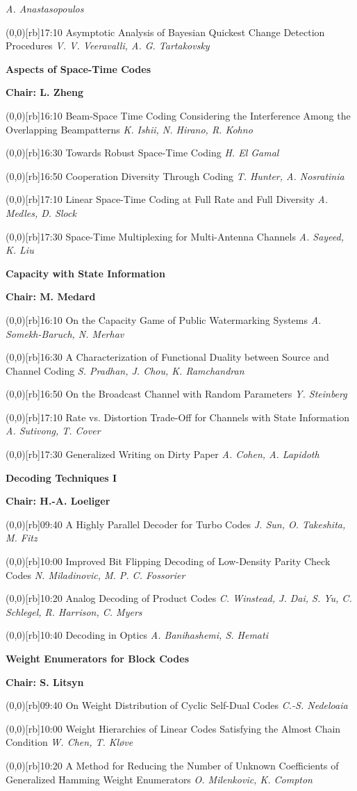 \documentclass[a5paper,twoside]{article}
\def\period#1{\flushleft{\large\bfseries #1}\markboth{\sf #1}{\sf #1}}
\def\sesstitle#1{\vspace{.45\bigskipamount}\par{\bfseries #1}\par}
\def\sesschair#1{{\bfseries Chair: #1}\par\vspace{.65\medskipamount}}
\def\papertime#1{\makebox(0,0)[rb]{{\scriptsize #1}\hspace{.5em}}}
\def\papertitle#1{#1\hfil\break}
\def\paperauthors#1{{\itshape #1}\par\filbreak\vspace{.65\medskipamount}}
\begin{document}
\paperauthors{A. Anastasopoulos}
\papertime{17:10}%
\papertitle{Asymptotic Analysis of Bayesian Quickest Change Detection Procedures}
\paperauthors{V. V. Veeravalli, A. G. Tartakovsky}
\sesstitle{Aspects of Space-Time Codes}
\sesschair{L. Zheng}
\papertime{16:10}%
\papertitle{Beam-Space Time Coding Considering the Interference Among the Overlapping Beampatterns}
\paperauthors{K. Ishii, N. Hirano, R. Kohno}
\papertime{16:30}%
\papertitle{Towards Robust Space-Time Coding}
\paperauthors{H. El Gamal}
\papertime{16:50}%
\papertitle{Cooperation Diversity Through Coding}
\paperauthors{T. Hunter, A. Nosratinia}
\papertime{17:10}%
\papertitle{Linear Space-Time Coding at Full Rate and Full Diversity}
\paperauthors{A. Medles, D. Slock}
\papertime{17:30}%
\papertitle{Space-Time Multiplexing for Multi-Antenna Channels}
\paperauthors{A. Sayeed, K. Liu}
\sesstitle{Capacity with State Information}
\sesschair{M. Medard}
\papertime{16:10}%
\papertitle{On the Capacity Game of Public Watermarking Systems}
\paperauthors{A. Somekh-Baruch, N. Merhav}
\papertime{16:30}%
\papertitle{A Characterization of Functional Duality between Source and Channel Coding}
\paperauthors{S. Pradhan, J. Chou, K. Ramchandran}
\papertime{16:50}%
\papertitle{On the Broadcast Channel with Random Parameters}
\paperauthors{Y. Steinberg}
\papertime{17:10}%
\papertitle{Rate vs. Distortion Trade-Off for Channels with State Information}
\paperauthors{A. Sutivong, T. Cover}
\papertime{17:30}%
\papertitle{Generalized Writing on Dirty Paper}
\paperauthors{A. Cohen, A. Lapidoth}
\period{Wed 09:40 -- 11:00}
\sesstitle{Decoding Techniques I}
\sesschair{H.-A. Loeliger}
\papertime{09:40}%
\papertitle{A Highly Parallel Decoder for Turbo Codes}
\paperauthors{J. Sun, O. Takeshita, M. Fitz}
\papertime{10:00}%
\papertitle{Improved Bit Flipping Decoding of Low-Density Parity Check Codes}
\paperauthors{N. Miladinovic, M. P. C. Fossorier}
\papertime{10:20}%
\papertitle{Analog Decoding of Product Codes}
\paperauthors{C. Winstead, J. Dai, S. Yu, C. Schlegel, R. Harrison, C. Myers}
\papertime{10:40}%
\papertitle{Decoding in Optics}
\paperauthors{A. Banihashemi, S. Hemati}
\sesstitle{Weight Enumerators for Block Codes}
\sesschair{S. Litsyn}
\papertime{09:40}%
\papertitle{On Weight Distribution of Cyclic Self-Dual Codes}
\paperauthors{C.-S. Nedeloaia}
\papertime{10:00}%
\papertitle{Weight Hierarchies of Linear Codes Satisfying the Almost Chain Condition}
\paperauthors{W. Chen, T. Kl{\o}ve}
\papertime{10:20}%
\papertitle{A Method for Reducing the Number of Unknown Coefficients of Generalized Hamming Weight Enumerators}
\paperauthors{O. Milenkovic, K. Compton}
\end{document}
